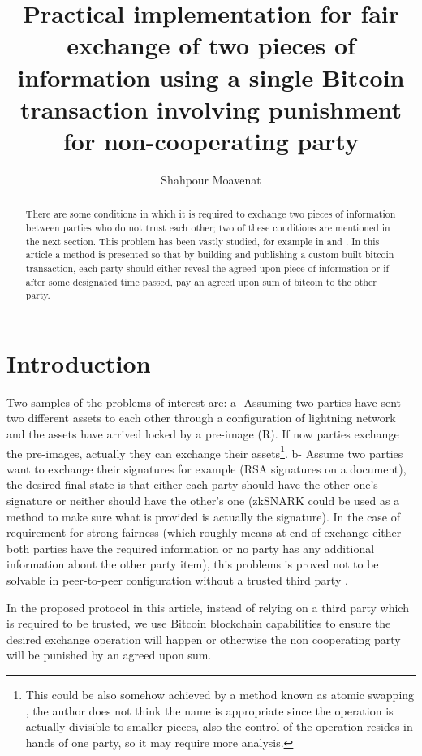 \documentclass[]{article}
\title{Practical implementation for fair exchange of two pieces of information using a single Bitcoin transaction involving punishment for non-cooperating party}
\author{Shahpour Moavenat}
\affil{Lykke Corp}
\begin{document}
\maketitle

\begin{abstract}
There are some conditions in which it is required to exchange two pieces of information between parties who do not trust each other; two of these conditions are mentioned in the next section. This problem has been vastly studied, for example in \cite{ray2002} and \cite{asokan99}. In this article a method is presented so that by building and publishing a custom built bitcoin transaction, each party should either reveal the agreed upon piece of information or if after some designated time passed, pay an agreed upon sum of bitcoin to the other party.


\end{abstract}

\section{Introduction}
Two samples of the problems of interest are: a- Assuming two parties have sent two different assets to each other through a configuration of lightning network \cite{lightning} and the assets have arrived locked by a pre-image (R). If now parties exchange the pre-images, actually they can exchange their assets\footnote{This could be also somehow achieved by a method known as atomic swapping \cite{lnswap}, the author does not think the name is appropriate since the operation is actually divisible to smaller pieces, also the control of the operation resides in hands of one party, so it may require more analysis.}. b- Assume two parties want to exchange their signatures for example (RSA signatures on a document), the desired final state is that either each party should have the other one's signature or neither should have the other's one (zkSNARK \cite{ethzkSNARK} could be used as a method to make sure what is provided is actually the signature). In the case of requirement for strong fairness (which roughly means at end of exchange either both parties have the required information or no party has any additional information about the other party item), this problems is proved not to be solvable in peer-to-peer configuration without a trusted third party \cite{impossible}.

In the proposed protocol in this article, instead of relying on a third party which is required to be trusted, we use Bitcoin blockchain capabilities to ensure the desired exchange operation will happen or otherwise the non cooperating party will be punished by an agreed upon sum.
\end{document}
